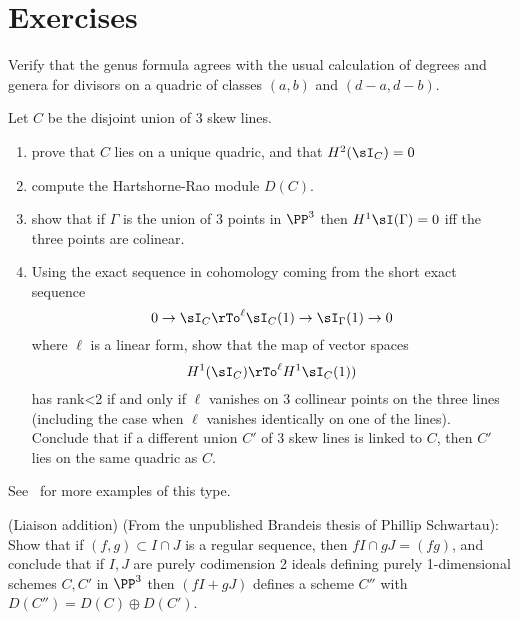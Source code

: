 \section{Exercises}

\begin{exercise}
 Verify that the genus formula agrees with the usual calculation of degrees and genera for divisors on a quadric of
 classes $(a,b)$ and $(d-a, d-b)$.
\end{exercise}

\begin{exercise}
Let $C$ be the disjoint union of 3 skew lines. 
\begin{enumerate}
 \item prove that $C$ lies on a unique quadric, and that $H^2(\sI_C) = 0$
 \item compute the Hartshorne-Rao module $D(C)$.
 \item show that if $\Gamma$ is the union of 3 points in $\PP^3$ then
 $H^1\sI(\Gamma) = 0$ iff the three points are colinear.
 \item Using the exact sequence in cohomology coming from the short exact sequence
$$
0\to \sI_C \rTo^{\ell} \sI_C(1) \to \sI_\Gamma(1) \to 0
$$
where $\ell$ is a linear form, show that the map of vector spaces
$$
H^1(\sI_C) \rTo^{\ell} H^1\sI_C(1))
$$
has rank<2 if and only if $\ell$ vanishes on 3 collinear points on the three lines (including the case when $\ell$ vanishes identically on one of the lines).
Conclude that if a different union $C'$ of 3 skew lines is linked to $C$, then $C'$ lies on the same quadric as $C$.
\end{enumerate}
See~\cite{Migliore} for more examples of this type.
\end{exercise}

\begin{exercise} (Liaison addition)\label{Liaison addition}
(From the unpublished Brandeis thesis of Phillip Schwartau): Show that if $(f, g)\subset I\cap J$ is a regular sequence,
 then $f I \cap gJ = (fg)$, and conclude that if $I,J$ are purely codimension 2 ideals
 defining purely 1-dimensional schemes $C,C'$ in $\PP^3$
 then  $(fI+gJ)$ defines a scheme $C''$ with $D(C'') = D(C) \oplus D(C')$.
\end{exercise}

